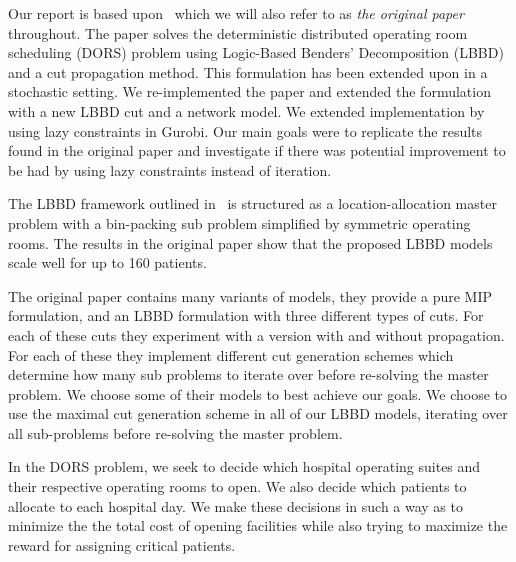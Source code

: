 Our report is based upon~\cite{roshanaei2017propagating} which we will also refer to as \textit{the original paper} throughout. The paper solves the deterministic distributed  operating room scheduling (DORS) problem using Logic-Based Benders' Decomposition (LBBD) and a cut propagation method. This formulation has been extended upon in a stochastic setting\cite{guo}. We re-implemented the paper and extended the formulation with a new LBBD cut and a network model. We extended implementation by using lazy constraints in Gurobi. Our main goals were to replicate the results found in the original paper and investigate if there was potential improvement to be had by using lazy constraints instead of iteration.

The LBBD framework outlined in~\cite{roshanaei2017propagating} is structured as a location-allocation master problem with a bin-packing sub problem simplified by symmetric operating rooms. The results in the original paper show that the proposed LBBD models scale well for up to 160 patients.

The original paper contains many variants of models, they provide a pure MIP formulation, and an LBBD formulation with three different types of cuts. For each of these cuts they experiment with a version with and without propagation. For each of these they implement different cut generation schemes which determine how many sub problems to iterate over before re-solving the master problem. We choose some of their models to best achieve our goals. We choose to use the maximal cut generation scheme in all of our LBBD models, iterating over all sub-problems before re-solving the master problem.

In the DORS problem, we seek to decide which hospital operating suites and their respective operating rooms to open. We also decide which patients to allocate to each hospital day. We make these decisions in such a way as to minimize the the total cost of opening facilities while also trying to maximize the reward for assigning critical patients\cite{roshanaei2017propagating}.